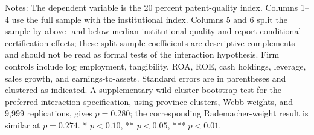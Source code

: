 \documentclass[12pt]{article}
\begin{document}
\begin{table}[htbp]
\centering
\caption{Baseline regressions: SRDI certification and institutional moderation}
\begin{minipage}{0.96\textwidth}
\footnotesize Notes: The dependent variable is the 20 percent patent-quality index. Columns 1--4 use the full sample with the institutional index. Columns 5 and 6 split the sample by above- and below-median institutional quality and report conditional certification effects; these split-sample coefficients are descriptive complements and should not be read as formal tests of the interaction hypothesis. Firm controls include log employment, tangibility, ROA, ROE, cash holdings, leverage, sales growth, and earnings-to-assets. Standard errors are in parentheses and clustered as indicated. A supplementary wild-cluster bootstrap test for the preferred interaction specification, using province clusters, Webb weights, and 9,999 replications, gives \(p=0.280\); the corresponding Rademacher-weight result is similar at \(p=0.274\). * \(p<0.10\), ** \(p<0.05\), *** \(p<0.01\).
\end{minipage}
\end{table}
\end{document}
